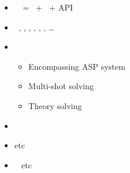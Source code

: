 \begin{frame}{\clingo}
  \begin{itemize}
  \item {} \ \clingo\ = \gringo\ + \clasp\ + API
  \item {} \
    \cpp,
    \java,
    \lua,
    \prolog,
    \python,
    \rust,
    \dots
  \item {} \
    \begin{itemize}
    \item Encompassing ASP system
    \item Multi-shot solving
    \item Theory solving
    \end{itemize}
  \item {} \ \cite{gekakasc17a,jakaosscscwa17a,karoscwa21a}
  \item {} \par
    \cite{liutru13a,gamarowawo15a,erdher20a,erfimapr20a,bojawe19a,schwitter12a,dabmar20a,ngstsoye20a,smanmapo12a,cosmma12a,dikophps20a,wotawa20a,bogerd20a,aisaam18a,becadolemamava21a,izmerd20a} etc
  \item \structure{Systems} \
    \cite{cafamu20a,bablee13a,scbhsuwa18a,tepfri18a,dvrawawo20a,bainkaokscsotawa18a,reraigpajh19a,eikarescwe17a} etc
  \end{itemize}
\end{frame}
%
